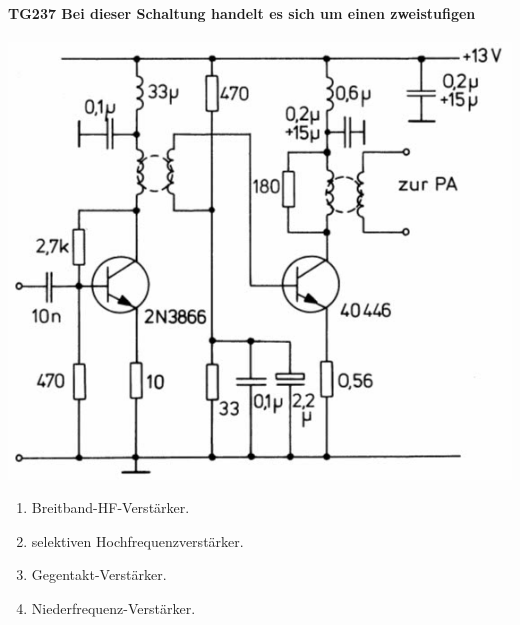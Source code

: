 \documentclass[8pt]{article}
\begin{document}
\paragraph*{TG237 Bei dieser Schaltung handelt es sich um einen zweistufigen}
\begin{center}
	\begin{minipage}{\linewidth}
		\centering
		\includegraphics[scale=1.0]{pics/tg237_a.jpg}
	\end{minipage}
\end{center}
\begin{enumerate}[nolistsep,label=\Alph*]
\item Breitband-HF-Verstärker.
\item selektiven Hochfrequenzverstärker.
\item Gegentakt-Verstärker.
\item Niederfrequenz-Verstärker.
\end{enumerate}
\end{document}
